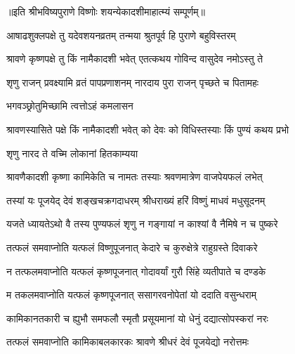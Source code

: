 ॥इति श्रीभविष्यपुराणे विष्णोः शयन्येकादशीमाहात्म्यं सम्पूर्णम्॥


\hyperref[sec:ekadashi_mahatmyam_vrata_raja]{\closesub}
\clearpage

\label{sec:vrata-raja-shravana-krishna-kamika}


\twolineshloka
{आषाढशुक्लपक्षे तु यदेवशयनव्रतम्}
{तन्मया श्रुतपूर्व हि पुराणे बहुविस्तरम्} %

\twolineshloka
{श्रावणे कृष्णपक्षे तु किं नामैकादशी भवेत्}
{एतत्कथय गोविन्द वासुदेव नमोऽस्तु ते} %


\twolineshloka
{शृणु राजन् प्रवक्ष्यामि व्रतं पापप्रणाशनम्}
{नारदाय पुरा राजन् पृच्छते च पितामहः} %



\onelineshloka
{भगवञ्छ्रोतुमिच्छामि त्वत्तोऽहं कमलासन} %

\twolineshloka
{श्रावणस्यासिते पक्षे किं नामैकादशी भवेत्}
{को देवः को विधिस्तस्याः किं पुण्यं कथय प्रभो} %



\onelineshloka
{शृणु नारद ते वच्मि लोकानां हितकाम्यया} %

\twolineshloka
{श्रावणैकादशी कृष्णा कामिकेति च नामतः}
{तस्याः श्रवणमात्रेण वाजपेयफलं लभेत्} %

\twolineshloka
{तस्यां यः पूजयेद् देवं शङ्खचक्रगदाधरम्}
{श्रीधराख्यं हरिं विष्णुं माधवं मधुसूदनम्} %

\twolineshloka
{यजते ध्यायतेऽथो वै तस्य पुण्यफलं शृणु}
{न गङ्गायां न काश्यां वै नैमिषे न च पुष्करे} %

\twolineshloka
{तत्फलं समवाप्नोति यत्फलं विष्णुपूजनात्}
{केदारे च कुरुक्षेत्रे राहुग्रस्ते दिवाकरे} %

\twolineshloka
{न तत्फलमवाप्नोति यत्फलं कृष्णपूजनात्}
{गोदावर्यां गुरौ सिंहे व्यतीपाते च दण्डके} %

\twolineshloka
{म तकलमवाप्नोति यत्फलं कृष्णपूजनात्}
{ससागरवनोपेतां यो ददाति वसुन्धराम्} %

\twolineshloka
{कामिकानतकारी च ह्युभौ समफलौ स्मृतौ}
{प्रसूयमानां यो धेनुं दद्यात्सोपस्करां नरः} %

\twolineshloka
{तत्फलं समवाप्नोति कामिकाबलकारकः}
{श्रावणे श्रीधरं देवं पूजयेद्यो नरोत्तमः} %

